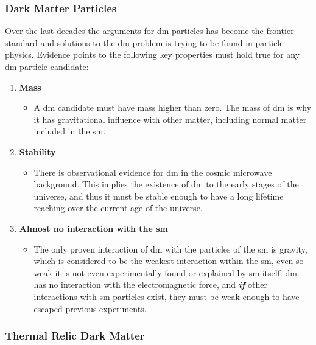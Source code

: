 \subsubsection{Dark Matter Particles}
\label{sec:dm_particles}

Over the last decades the arguments for \gls{dm} particles has become the frontier standard and solutions to the \gls{dm} problem is trying to be found in particle physics. Evidence points to the following key properties must hold true for any \gls{dm} particle candidate:

\begin{enumerate}
    \item \textbf{Mass}
    \begin{itemize}
        \item A \gls{dm} candidate must have mass higher than zero. The mass of \gls{dm} is why it has gravitational influence with other matter, including normal matter included in the \gls{sm}. 
    \end{itemize}
    \item \textbf{Stability}
    \begin{itemize}
        \item There is observational evidence for \gls{dm} in the cosmic microwave background. This implies the existence of \gls{dm} to the early stages of the universe, and thus it must be stable enough to have a long lifetime reaching over the current age of the universe.
    \end{itemize}
    \item \textbf{Almost no interaction with the \gls{sm}}
    \begin{itemize}
        \item The only proven interaction of \gls{dm} with the particles of the \gls{sm} is gravity, which is considered to be the weakest interaction within the \gls{sm}, even so weak it is not even experimentally found or explained by \gls{sm} itself. \gls{dm} has no interaction with the electromagnetic force, and \textbf{\textit{if}} other interactions with \gls{sm} particles exist, they must be weak enough to have escaped previous experiments. 
    \end{itemize}
\end{enumerate}

\subsubsection{Thermal Relic Dark Matter}
\label{sec:termal_relic}


